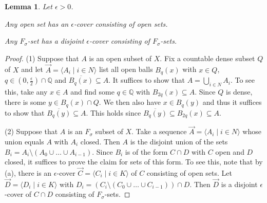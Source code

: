 \documentclass[10pt]{amsart}
\newcommand{\QQ}{\mathbb{Q}}
\newcommand{\NN}{\mathbb{N}}
\newtheorem{lemma}[theorem]{Lemma}
\theoremstyle{definition}
\theoremstyle{remark}
\newenvironment{enumerate-(1)}{\begin{enumerate}[label={\upshape (\arabic*)}, leftmargin=2pc]}{\end{enumerate}}
\begin{document}
\begin{lemma} \label{partition epsilon-covers} 
Let $\epsilon>0$. 
\begin{enumerate-(1)} 
\item \label{partition epsilon-covers - open sets} 
Any open set has an $\epsilon$-cover consisting of open sets. 
\item 
Any $F_\sigma$-set has a disjoint $\epsilon$-cover consisting of $F_\sigma$-sets. 
\end{enumerate-(1)} 
\end{lemma} 
\begin{proof} 
(1) 
Suppose that $A$ is an open subset of $X$. 
Fix a countable dense subset $Q$ of $X$ and let $\vec{A}=\langle A_i\mid i\in N\rangle$ list all open balls $B_q(x)$ with $x\in Q$, $q\in (0,\frac{\epsilon}{2})\cap \QQ$ and $\overline{B_q(x)}\subseteq A$. 
It suffices to show that $A=\bigcup_{i\in N} A_i$. To see this, take any $x\in A$ and find some $q\in \QQ$ with $B_{2q}(x)\subseteq A$. 
Since $Q$ is dense, there is some $y\in B_q(x)\cap Q$. We then also have $x\in B_q(y)$ and thus it suffices to show that $\overline{B_q(y)}\subseteq A$. 
This holds since $\overline{B_q(y)}\subseteq B_{2q}(x)\subseteq A$. 

(2) 
Suppose that $A$ is an $F_\sigma$ subset of $X$. 
Take a sequence $\vec{A}=\langle A_i\mid i\in N\rangle$ whose union equals $A$ with $A_i$ closed. 
Then $A$ is the disjoint union of the sets $B_i=A_i\setminus (A_0\cup\dots\cup A_{i-1})$. 
Since $B_i$ is of the form $C\cap D$ with $C$ open and $D$ closed, it suffices to prove the claim for sets of this form. 
To see this, note that by (a), there is an $\epsilon$-cover $\vec{C}=\langle C_i\mid i\in K\rangle$ of $C$ consisting of open sets. 
Let $\vec{D}=\langle D_i\mid i\in K\rangle$ with $D_i=(C_i\setminus (C_0\cup\dots\cup C_{i-1}))\cap D$. 
Then $\vec{D}$ is a disjoint $\epsilon$-cover of $C\cap D$ consisting of $F_\sigma$-sets. 
\end{proof} 


\end{document}
